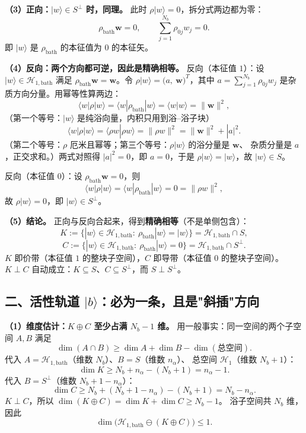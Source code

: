 \documentclass[11pt]{ctexart}
\begin{document}
\textbf{（3）正向：$|w\rangle\in S^{\perp}$ 时，同理。}
此时 $\rho|w\rangle=0$，拆分式两边都为零：
\[
\rho_{\mathrm{bath}}\mathbf{w}=0,\qquad
\sum_{j=1}^{N_b}\rho_{0j}w_j=0.
\]
即 $|w\rangle$ 是 $\rho_{\mathrm{bath}}$ 的本征值为 $0$ 的本征矢。

\textbf{（4）反向：两个方向都可逆，因此是精确相等。}
反向（本征值 $1$）：设 $|w\rangle\in\mathcal{H}_{1,\mathrm{bath}}$ 满足
$\rho_{\mathrm{bath}}\mathbf{w}=\mathbf{w}$。令
$\rho|w\rangle=\big(a,\ \mathbf{w}\big)^T$，其中
$a=\sum_{j=1}^{N_b}\rho_{0j}w_j$ 是杂质方向分量。用幂等性算两边：
\[
\langle w|\rho|w\rangle
=
\langle w|\rho_{\mathrm{bath}}|w\rangle
=
\langle w|w\rangle
=
\|\mathbf{w}\|^2 ,
\]
（第一个等号：$|w\rangle$ 是纯浴向量，内积只用到浴--浴子块）
\[
\langle w|\rho|w\rangle
=
\langle \rho w|\rho w\rangle
=
\|\rho w\|^2
=
\|\mathbf{w}\|^2+|a|^2 .
\]
（第二个等号：$\rho$ 厄米且幂等；第三个等号：$\rho|w\rangle$ 的浴分量是 $\mathbf{w}$、
杂质分量是 $a$，正交求和。）两式对照得 $|a|^2=0$，即 $a=0$，于是
$\rho|w\rangle=|w\rangle$，故 $|w\rangle\in S$。

反向（本征值 $0$）：设 $\rho_{\mathrm{bath}}\mathbf{w}=0$，则
\[
\langle w|\rho|w\rangle=\langle w|\rho_{\mathrm{bath}}|w\rangle=0
=\|\rho w\|^2 ,
\]
故 $\rho|w\rangle=0$，即 $|w\rangle\in S^{\perp}$。

\textbf{（5）结论。}
正向与反向合起来，得到\textbf{精确相等}（不是单侧包含）：
\[
K:=\big\{|w\rangle\in\mathcal{H}_{1,\mathrm{bath}}:\ \rho_{\mathrm{bath}}|w\rangle=|w\rangle\big\}
=
\mathcal{H}_{1,\mathrm{bath}}\cap S ,
\]
\[
C:=\big\{|w\rangle\in\mathcal{H}_{1,\mathrm{bath}}:\ \rho_{\mathrm{bath}}|w\rangle=0\big\}
=
\mathcal{H}_{1,\mathrm{bath}}\cap S^{\perp} .
\]
$K$ 即价带（本征值 $1$ 的整块子空间），$C$ 即导带（本征值 $0$ 的整块子空间）。
$K\perp C$ 自动成立：$K\subseteq S$、$C\subseteq S^{\perp}$，而 $S\perp S^{\perp}$。

\subsection{二、活性轨道 $|b\rangle$：必为一条，且是"斜插"方向}

\textbf{（1）维度估计：$K\oplus C$ 至少占满 $N_b-1$ 维。}
用一般事实：同一空间的两个子空间 $A,B$ 满足
\[
\dim(A\cap B)\ge\dim A+\dim B-\dim(\text{总空间}).
\]
代入 $A=\mathcal{H}_{1,\mathrm{bath}}$（维数 $N_b$）、$B=S$（维数 $n_\alpha$）、
总空间 $\mathcal{H}_1$（维数 $N_b+1$）：
\[
\dim K\ge N_b+n_\alpha-(N_b+1)=n_\alpha-1.
\]
代入 $B=S^{\perp}$（维数 $N_b+1-n_\alpha$）：
\[
\dim C\ge N_b+(N_b+1-n_\alpha)-(N_b+1)=N_b-n_\alpha.
\]
$K\perp C$，所以 $\dim(K\oplus C)=\dim K+\dim C\ge N_b-1$。
浴子空间共 $N_b$ 维，因此
\[
\dim\Big(\mathcal{H}_{1,\mathrm{bath}}\ominus(K\oplus C)\Big)\le 1.
\]
\end{document}
